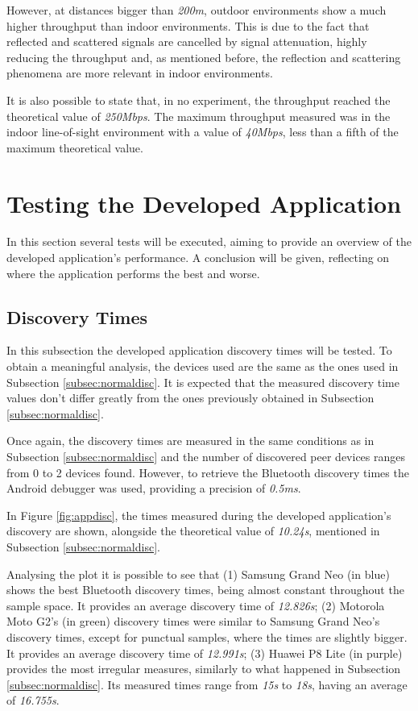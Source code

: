 However, at distances bigger than \textit{200m}, outdoor environments show a much higher throughput than indoor environments. This is due to the fact that reflected and scattered signals are cancelled by signal attenuation, highly reducing the throughput and, as mentioned before, the reflection and scattering phenomena are more relevant in indoor environments.

It is also possible to state that, in no experiment, the throughput reached the theoretical value of \textit{250Mbps}. The maximum throughput measured was in the indoor line-of-sight environment with a value of \textit{40Mbps}, less than a fifth of the maximum theoretical value.

\section{Testing the Developed Application}

In this section several tests will be executed, aiming to provide an overview of the developed application's performance. A conclusion will be given, reflecting on where the application performs the best and worse.

\subsection{Discovery Times}
\label{subsec:appdisc}

In this subsection the developed application discovery times will be tested. To obtain a meaningful analysis, the devices used are the same as the ones used in Subsection \ref{subsec:normaldisc}. It is expected that the measured discovery time values don't differ greatly from the ones previously obtained in Subsection \ref{subsec:normaldisc}.

Once again, the discovery times are measured in the same conditions as in Subsection \ref{subsec:normaldisc} and the number of discovered peer devices ranges from 0 to 2 devices found. However, to retrieve the Bluetooth discovery times the Android debugger was used, providing a precision of \textit{0.5ms}.

In Figure \ref{fig:appdisc}, the times measured during the developed application's discovery are shown, alongside the theoretical value of \textit{10.24s}, mentioned in Subsection \ref{subsec:normaldisc}.

Analysing the plot it is possible to see that (1) Samsung Grand Neo (in blue) shows the best Bluetooth discovery times, being almost constant throughout the sample space. It provides an average discovery time of \textit{12.826s}; (2) Motorola Moto G2's (in green) discovery times were similar to Samsung Grand Neo's discovery times, except for punctual samples, where the times are slightly bigger. It provides an average discovery time of \textit{12.991s}; (3) Huawei P8 Lite (in purple) provides the most irregular measures, similarly to what happened in Subsection \ref{subsec:normaldisc}. Its measured times range from \textit{15s} to \textit{18s}, having an average of \textit{16.755s}.

